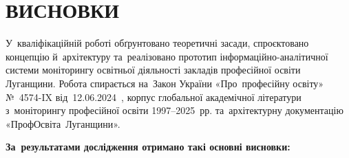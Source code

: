 
\section*{\centering ВИСНОВКИ}

У~кваліфікаційній роботі обґрунтовано теоретичні засади, спроєктовано концепцію й~архітектуру та~реалізовано прототип інформаційно-аналітичної системи моніторингу освітньої діяльності закладів професійної освіти Луганщини. Робота спирається на~Закон України «Про~професійну освіту» №~4574-IX від~12.06.2024~\cite{Zakon4574IX}, корпус глобальної академічної літератури з~моніторингу професійної освіти 1997--2025~рр. та~архітектурну документацію «ПрофОсвіта~Луганщини».

\textbf{За~результатами дослідження отримано такі основні висновки:}

